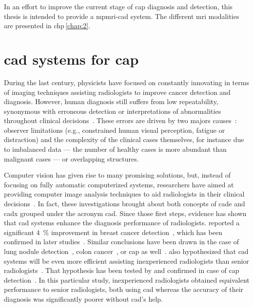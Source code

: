 In an effort to improve the current stage of \ac{cap} diagnosis and detection, this thesis is intended to provide a \ac{mpmri}-\acs{cad} system. 
The different \ac{mri} modalities are presented in \acs{chp}\,\ref{chap:2}. 

\section{\acs*{cad} systems for \acs*{cap}}\label{sec:intro:cad} 
During the last century, physicists have focused on constantly innovating in terms of imaging techniques assisting radiologists to improve cancer detection and diagnosis.
However, human diagnosis still suffers from low repeatability, synonymous with erroneous detection or interpretations of abnormalities throughout clinical decisions~\cite{Giger2008,Hambrock2013}.
These errors are driven by two majors causes~\cite{Giger2008}: observer limitations (e.g., constrained human visual perception, fatigue or distraction) and the complexity of the clinical cases themselves, for instance due to imbalanced data --- the number of healthy cases is more abundant than malignant cases --- or overlapping structures.

Computer vision has given rise to many promising solutions, but, instead of focusing on fully automatic computerized systems, researchers have aimed at providing computer image analysis techniques to aid radiologists in their clinical decisions~\cite{Giger2008}.
In fact, these investigations brought about both concepts of \ac{cade} and \ac{cadx} grouped under the acronym \ac{cad}.
Since those first steps, evidence has shown that \ac{cad} systems enhance the diagnosis performance of radiologists.
\citeauthor{Chan1999} reported a significant \SI{4}{\percent} improvement in breast cancer detection~\cite{Chan1999}, which has been confirmed in later studies~\cite{Dean2006}.
Similar conclusions have been drawn in the case of lung nodule detection~\cite{Li2004}, colon cancer~\cite{Petrick2008}, or \ac{cap} as well~\cite{Hambrock2013}.
\citeauthor{Chan1999} also hypothesized that \acs{cad} systems will be even more efficient assisting inexperienced radiologists than senior radiologists~\cite{Chan1999}.
That hypothesis has been tested by \citeauthor{Hambrock2013} and confirmed in case of \ac{cap} detection~\cite{Hambrock2013}.
In this particular study, inexperienced radiologists obtained equivalent performance to senior radiologists, both using \acs{cad} whereas the accuracy of their diagnosis was significantly poorer without \ac{cad}'s help.

